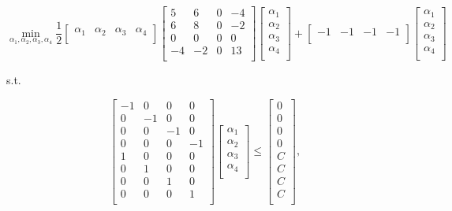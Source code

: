 \documentclass[10pt]{article}
\begin{document}
\[
\min_{\alpha_1, \alpha_2, \alpha_3, \alpha_4}
\frac{1}{2}
\begin{bmatrix}
    \alpha_1 & \alpha_2 & \alpha_3 & \alpha_4 \\
\end{bmatrix}
\begin{bmatrix}
    5       & 6 & 0 & -4 \\
    6       & 8 & 0 & -2 \\
    0       & 0 & 0 & 0 \\
    -4       & -2 & 0 & 13 \\
\end{bmatrix}
\begin{bmatrix}
    \alpha_1 \\
    \alpha_2 \\
    \alpha_3 \\
    \alpha_4 \\
\end{bmatrix} 
+
\begin{bmatrix}
    -1       & -1 & -1 & -1 \\
\end{bmatrix}
\begin{bmatrix}
    \alpha_1 \\
    \alpha_2 \\
    \alpha_3 \\
    \alpha_4 \\
\end{bmatrix} 
\]

\begin{center}
s.t.
\end{center}

\[
\begin{bmatrix}
    -1 & 0 & 0 & 0 \\
    0 & -1 & 0 & 0 \\
    0 & 0 & -1 & 0 \\
    0 & 0 & 0 & -1 \\
    1 & 0 & 0 &0 \\
    0 & 1 & 0 & 0 \\
    0 & 0 & 1 & 0 \\
    0 & 0 & 0 & 1 \\
\end{bmatrix}
\begin{bmatrix}
    \alpha_1 \\
    \alpha_2 \\
    \alpha_3 \\
    \alpha_4 \\
\end{bmatrix} 
\leq
\begin{bmatrix}
0 \\
0 \\ 
0 \\ 
0 \\ 
C \\
C \\ 
C \\ 
C \\
\end{bmatrix},
\]
\end{document}
